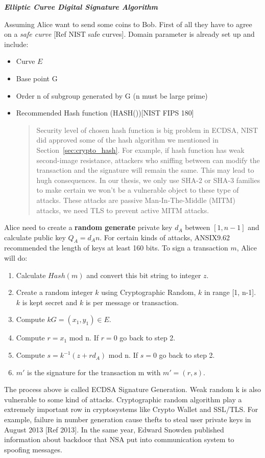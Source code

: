 \bigskip
{\textit {\textbf{Elliptic Curve Digital Signature Algorithm}}}

Assuming Alice want to send some coins to Bob. First of all they have to agree on a \emph{safe curve} [Ref NIST safe curves].
Domain parameter is already set up and include:
\begin{itemize}
  \item Curve $E$
  \item Base point G
  \item Order n of subgroup generated by G (n must be large prime)
  \item Recommended Hash function (HASH())[NIST FIPS 180]
        \begin{quote}
          Security level of chosen hash function is big problem in ECDSA, NIST did approved some of the hash algorithm we mentioned in Section~\ref{sec:crypto_hash}.
          For example, if hash function has weak second-image resistance, attackers who sniffing between can modify the transaction and the signature will remain the same.
          This may lead to hugh consequences.
          In our thesis, we only use SHA-2 or SHA-3 families to make certain we won't be a vulnerable object to these type of attacks. These attacks are passive Man-In-The-Middle (MITM) attacks, we need TLS to prevent active MITM attacks.
        \end{quote}
\end{itemize}

Alice need to create a {\bf random generate} private key $d_A$ between $[1, n-1]$ and calculate public key $Q_A = d_An$.
For certain kinds of attacks, ANSIX9.62 recommended the length of keys at least 160 bits.
To sign a transaction $m$, Alice will do:
\begin{enumerate}
  \item Calculate $Hash(m)$ and convert this bit string to integer $z$.
  \item Create a random integer $k$ using Cryptographic Random, $k$ in range [1, n-1]. $k$ is kept secret and $k$ is per message or transaction.
  \item Compute $kG = (x_1, y_1) \in E$.
  \item Compute $r=x_1$ mod n. If $r = 0$ go back to step 2.
  \item Compute $s=k^{-1}(z + rd_A)$ mod n. If $s = 0$ go back to step 2.
  \item $m'$ is the signature for the transaction m with $m' = (r, s)$.
\end{enumerate}
The process above is called ECDSA Signature Generation.
Weak random k is also vulnerable to some kind of attacks.
Cryptographic random algorithm play a extremely important row in cryptosystems like Crypto Wallet and SSL/TLS.
For example, failure in number generation cause thefts to steal user private keys in August 2013 [Ref 2013].
In the same year, Edward Snowden published information about backdoor that NSA put into communication system to spoofing messages.

